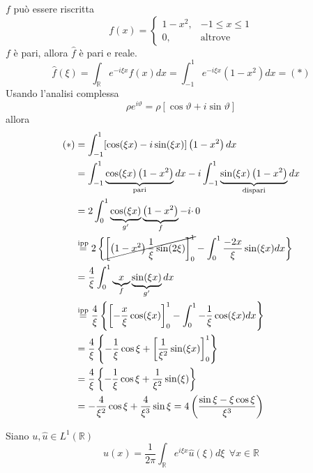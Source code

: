 $f$ può essere riscritta
\begin{equation*}
f( x) =\begin{cases}
1-x^{2} , & -1\leqslant x\leqslant 1\\
0, & \text{altrove}
\end{cases}
\end{equation*}
$f$ è pari, allora $\hat{f}$ è pari e reale.
\begin{equation*}
\hat{f}( \xi ) =\int _{\mathbb{R}} e^{-i\xi x} f( x) dx=\int ^{1}_{-1} e^{-i\xi x}\left( 1-x^{2}\right) dx=( *)
\end{equation*}
Usando l'analisi complessa
\begin{equation*}
\rho e^{i\vartheta } =\rho [\cos \vartheta +i\sin \vartheta ]
\end{equation*}
allora
\begin{align*}
( *) & =\int ^{1}_{-1}[\cos( \xi x) -i\sin( \xi x)]\left( 1-x^{2}\right) dx\\
 & =\int ^{1}_{-1}\underbrace{\cos( \xi x)\left( 1-x^{2}\right)}_{\text{pari}} dx-i\int ^{1}_{-1}\underbrace{\sin( \xi x)\left( 1-x^{2}\right)}_{\text{dispari}} dx\\
 & =2\int ^{1}_{0}\underbrace{\cos( \xi x)}_{g'}\underbrace{\left( 1-x^{2}\right)}_{f} -i\cdotp 0\\
 & \overset{\text{ipp}}{=} 2\left\{\cancel{\left[\left( 1-x^{2}\right)\frac{1}{\xi }\sin( 2\xi )\right]^{1}_{0}} -\int ^{1}_{0}\frac{-2x}{\xi }\sin( \xi x) dx\right\}\\
 & =\frac{4}{\xi }\int ^{1}_{0}\underbrace{x}_{f}\underbrace{\sin( \xi x)}_{g'} dx\\
 & \overset{\text{ipp}}{=}\frac{4}{\xi }\left\{\left[ -\frac{x}{\xi }\cos( \xi x)\right]^{1}_{0} -\int ^{1}_{0} -\frac{1}{\xi }\cos( \xi x) dx\right\}\\
 & =\frac{4}{\xi }\left\{-\frac{1}{\xi }\cos \xi +\left[\frac{1}{\xi ^{2}}\sin( \xi x)\right]^{1}_{0}\right\}\\
 & =\frac{4}{\xi }\left\{-\frac{1}{\xi }\cos \xi +\frac{1}{\xi ^{2}}\sin( \xi )\right\}\\
 & =-\frac{4}{\xi ^{2}}\cos \xi +\frac{4}{\xi ^{3}}\sin \xi =4\left(\frac{\sin \xi -\xi \cos \xi }{\xi ^{3}}\right)
\end{align*}
\begin{thm}
 Siano $u,\hat{u} \in L^{1}(\mathbb{R})$
\begin{equation*}
\boxed{u( x) =\frac{1}{2\pi }\int _{\mathbb{R}} e^{i\xi x}\hat{u}( \xi ) d\xi \ \ \forall x\in \mathbb{R}}
\end{equation*}
\end{thm}
